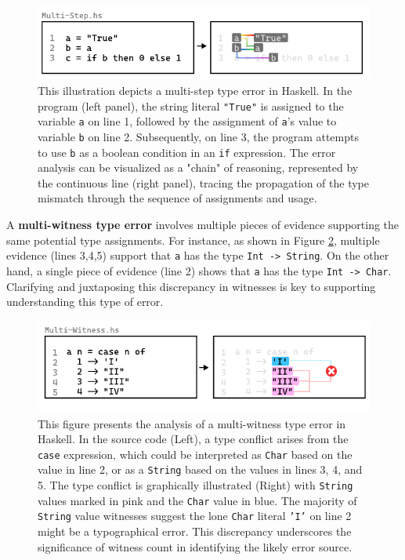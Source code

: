 \begin{figure}[htbp]
  \includegraphics[width=\linewidth]{Multi-Step}
  \caption[This illustration depicts a multi-step type error in Haskell]{
    \label{fig:multi-step-example}
    This illustration depicts a multi-step type error in Haskell. In the program (left panel), the string literal \texttt{"True"} is assigned to the variable \texttt{a} on line 1, followed by the assignment of \texttt{a}'s value to variable \texttt{b} on line 2. Subsequently, on line 3, the program attempts to use \texttt{b} as a boolean condition in an \texttt{if} expression. The error analysis can be visualized as a "chain" of reasoning, represented by the continuous line (right panel), tracing the propagation of the type mismatch through the sequence of assignments and usage. }
\end{figure}

A \textbf{multi-witness type error} involves multiple pieces of evidence supporting the same potential type assignments. For instance, as shown in Figure \ref{fig:multi-witness-example}, multiple evidence (lines 3,4,5) support that \texttt{a} has the type \texttt{Int -> String}. On the other hand, a single piece of evidence (line 2) shows that \texttt{a} has the type \texttt{Int -> Char}.  Clarifying and juxtaposing this discrepancy in witnesses is key to supporting understanding this type of error.

\begin{figure}[htbp]
\centering  \includegraphics[width=\linewidth]{Multi-Witness}
  \caption[This illustration depicts a multi-witness type error in Haskell]{
    \label{fig:multi-witness-example}
    This figure presents the analysis of a multi-witness type error in Haskell. In the source code (Left), a type conflict arises from the \texttt{case} expression, which could be interpreted as \texttt{Char} based on the value in line 2, or as a \texttt{String} based on the values in lines 3, 4, and 5. The type conflict is graphically illustrated (Right) with \texttt{String} values marked in pink and the \texttt{Char} value in blue. The majority of \texttt{String} value witnesses suggest the lone \texttt{Char} literal \texttt{'I'} on line 2 might be a typographical error. This discrepancy underscores the significance of witness count in identifying the likely error source.}
\end{figure}

